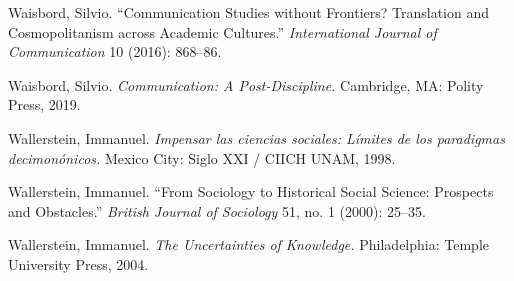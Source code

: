 \documentclass{tufte-handout}
\begin{document}
\begin{hangparas}{.25in}{1}
Waisbord, Silvio. ``Communication Studies without Frontiers? Translation
and Cosmopolitanism across Academic Cultures.'' \emph{International
Journal of Communication} 10 (2016): 868--86.

Waisbord, Silvio. \emph{Communication: A Post-Discipline.} Cambridge,
MA: Polity Press, 2019.

\pagebreak Wallerstein, Immanuel. \emph{Impensar las ciencias sociales: Límites de
los paradigmas decimonónicos.} Mexico City: Siglo XXI / CIICH UNAM,
1998.

Wallerstein, Immanuel. ``From Sociology to Historical Social Science:
Prospects and Obstacles.'' \emph{British Journal of Sociology} 51, no. 1
(2000): 25--35.

Wallerstein, Immanuel. \emph{The Uncertainties of Knowledge.}
Philadelphia: Temple University Press, 2004.



\end{hangparas}
\end{document}
